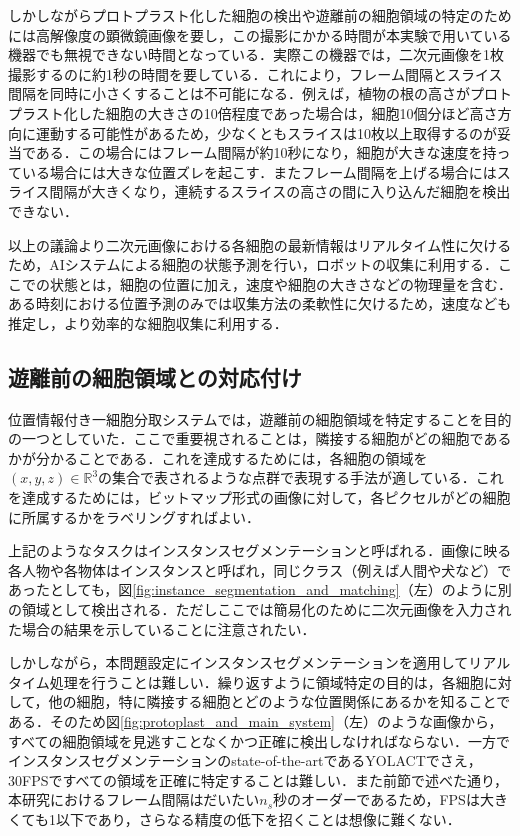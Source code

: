     しかしながらプロトプラスト化した細胞の検出や遊離前の細胞領域の特定のためには高解像度の顕微鏡画像を要し，この撮影にかかる時間が本実験で用いている機器でも無視できない時間となっている．実際この機器では，二次元画像を1枚撮影するのに約1秒の時間を要している．これにより，フレーム間隔とスライス間隔を同時に小さくすることは不可能になる．例えば，植物の根の高さがプロトプラスト化した細胞の大きさの10倍程度であった場合は，細胞10個分ほど高さ方向に運動する可能性があるため，少なくともスライスは10枚以上取得するのが妥当である．この場合にはフレーム間隔が約10秒になり，細胞が大きな速度を持っている場合には大きな位置ズレを起こす．またフレーム間隔を上げる場合にはスライス間隔が大きくなり，連続するスライスの高さの間に入り込んだ細胞を検出できない．

    以上の議論より二次元画像における各細胞の最新情報はリアルタイム性に欠けるため，AIシステムによる細胞の状態予測を行い，ロボットの収集に利用する．ここでの状態とは，細胞の位置に加え，速度や細胞の大きさなどの物理量を含む．ある時刻における位置予測のみでは収集方法の柔軟性に欠けるため，速度なども推定し，より効率的な細胞収集に利用する．

    \subsection{遊離前の細胞領域との対応付け}

    位置情報付き一細胞分取システムでは，遊離前の細胞領域を特定することを目的の一つとしていた．ここで重要視されることは，隣接する細胞がどの細胞であるかが分かることである．これを達成するためには，各細胞の領域を${(x, y, z)} \in \mathbb{R}^3$の集合で表されるような点群で表現する手法が適している．これを達成するためには，ビットマップ形式の画像に対して，各ピクセルがどの細胞に所属するかをラベリングすればよい．

    上記のようなタスクはインスタンスセグメンテーション\cite{hafiz2020survey}と呼ばれる．画像に映る各人物や各物体はインスタンスと呼ばれ，同じクラス（例えば人間や犬など）であったとしても，図\ref{fig:instance_segmentation_and_matching}（左）のように別の領域として検出される．ただしここでは簡易化のために二次元画像を入力された場合の結果を示していることに注意されたい．

    しかしながら，本問題設定にインスタンスセグメンテーションを適用してリアルタイム処理を行うことは難しい．繰り返すように領域特定の目的は，各細胞に対して，他の細胞，特に隣接する細胞とどのような位置関係にあるかを知ることである．そのため図\ref{fig:protoplast_and_main_system}（左）のような画像から，すべての細胞領域を見逃すことなくかつ正確に検出しなければならない．一方でインスタンスセグメンテーションのstate-of-the-artであるYOLACT\cite{Bolya_2019_ICCV}でさえ，30FPSですべての領域を正確に特定することは難しい．また前節で述べた通り，本研究におけるフレーム間隔はだいたい$n_s$秒のオーダーであるため，FPSは大きくても1以下であり，さらなる精度の低下を招くことは想像に難くない．

